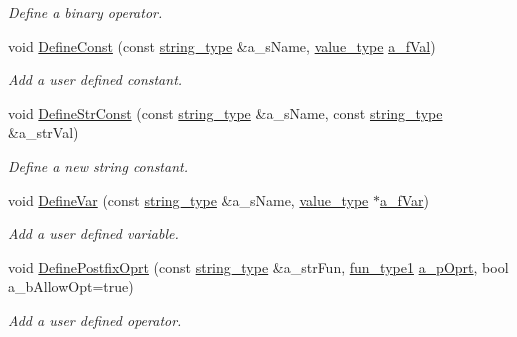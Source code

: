 \begin{DoxyCompactItemize}
\begin{DoxyCompactList}\small\item\em Define a binary operator. \end{DoxyCompactList}\item 
void \hyperlink{classmu_1_1_parser_base_a8cbb0a5e193daeea647d80dc89f34c65}{Define\+Const} (const \hyperlink{namespacemu_ae9f8b44d9a97dd397180891e8390c3e9}{string\+\_\+type} \&a\+\_\+s\+Name, \hyperlink{namespacemu_a17d4f113a4b88b8d971cca8ddbbe8a47}{value\+\_\+type} \hyperlink{mu_parser_d_l_l_8h_a8ed6c2f8e84831a06620ad0546609ae6}{a\+\_\+f\+Val})
\begin{DoxyCompactList}\small\item\em Add a user defined constant. \end{DoxyCompactList}\item 
void \hyperlink{classmu_1_1_parser_base_a64bc1de3b6db42140fe6f4860c30e40a}{Define\+Str\+Const} (const \hyperlink{namespacemu_ae9f8b44d9a97dd397180891e8390c3e9}{string\+\_\+type} \&a\+\_\+s\+Name, const \hyperlink{namespacemu_ae9f8b44d9a97dd397180891e8390c3e9}{string\+\_\+type} \&a\+\_\+str\+Val)
\begin{DoxyCompactList}\small\item\em Define a new string constant. \end{DoxyCompactList}\item 
void \hyperlink{classmu_1_1_parser_base_a8350970819c77352af8d79ce3110393e}{Define\+Var} (const \hyperlink{namespacemu_ae9f8b44d9a97dd397180891e8390c3e9}{string\+\_\+type} \&a\+\_\+s\+Name, \hyperlink{namespacemu_a17d4f113a4b88b8d971cca8ddbbe8a47}{value\+\_\+type} $\ast$\hyperlink{mu_parser_d_l_l_8h_a0b10cccae0b2da3678c7a7f0cd7fbc73}{a\+\_\+f\+Var})
\begin{DoxyCompactList}\small\item\em Add a user defined variable. \end{DoxyCompactList}\item 
void \hyperlink{classmu_1_1_parser_base_ae9fb4d2348213a0e42dc07a4589ac654}{Define\+Postfix\+Oprt} (const \hyperlink{namespacemu_ae9f8b44d9a97dd397180891e8390c3e9}{string\+\_\+type} \&a\+\_\+str\+Fun, \hyperlink{namespacemu_affeaec09801b502b9955d7248b7e2706}{fun\+\_\+type1} \hyperlink{mu_parser_d_l_l_8h_ae106b6975be89f5cf1d116ebca53cccc}{a\+\_\+p\+Oprt}, bool a\+\_\+b\+Allow\+Opt=true)
\begin{DoxyCompactList}\small\item\em Add a user defined operator. \end{DoxyCompactList}\item 

\end{DoxyCompactItemize}
